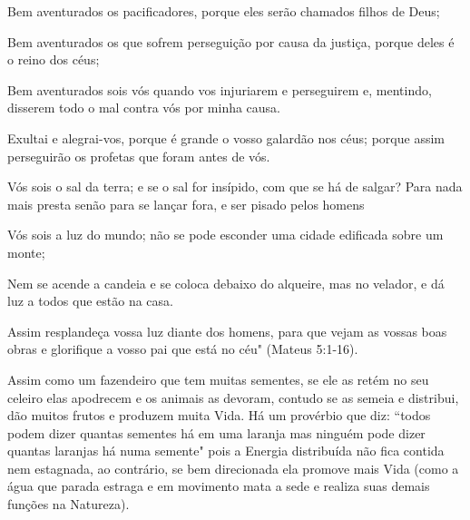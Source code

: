 \emdash{} Bem aventurados os pacificadores, porque eles serão chamados filhos de Deus;

\emdash{} Bem aventurados os que sofrem perseguição por causa da justiça, porque deles é o reino dos céus;

\emdash{} Bem aventurados sois vós quando vos injuriarem e perseguirem e, mentindo, disserem todo o mal contra vós por minha causa.

\emdash{} Exultai e alegrai-vos, porque é grande o vosso galardão nos céus; porque assim perseguirão os profetas que foram antes de vós.

\emdash{} Vós sois o sal da terra; e se o sal for insípido, com que se há de salgar? Para nada mais presta senão para se lançar fora, e ser pisado pelos homens

\emdash{} Vós sois a luz do mundo; não se pode esconder uma cidade edificada sobre um monte;

\emdash{} Nem se acende a candeia e se coloca debaixo do alqueire, mas no velador, e dá luz a todos que estão na casa.

\emdash{} Assim resplandeça vossa luz diante dos homens, para que vejam as vossas boas obras e glorifique a vosso pai que está no céu" (Mateus 5:1-16).

\emdash{}Assim como um fazendeiro que tem muitas sementes, se ele as retém no seu celeiro elas apodrecem e os animais as devoram, contudo se as semeia e distribui, dão muitos frutos e produzem muita Vida. Há um provérbio que diz: ``todos podem dizer quantas sementes há em uma laranja mas ninguém pode dizer quantas laranjas há numa semente" pois a Energia distribuída não fica contida nem estagnada, ao contrário, se bem direcionada ela promove mais Vida (como a água que parada estraga e em movimento mata a sede e realiza suas demais funções na Natureza).